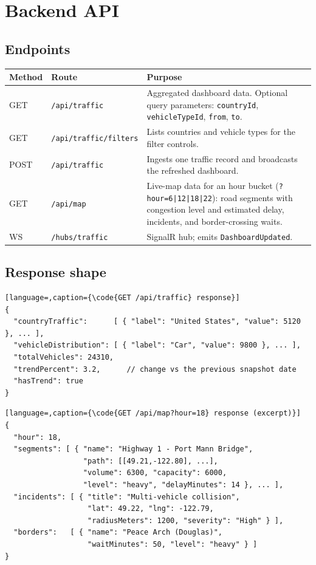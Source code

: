 \documentclass[11pt,a4paper]{article}
\newcommand{\code}[1]{\texttt{\small #1}}
\begin{document}
\section{Backend API}
\subsection{Endpoints}
\begin{longtable}{@{}llp{72mm}@{}}
\toprule
\textbf{Method} & \textbf{Route} & \textbf{Purpose} \\
\midrule
\endhead
GET  & \code{/api/traffic}         & Aggregated dashboard data. Optional query
       parameters: \code{countryId}, \code{vehicleTypeId}, \code{from},
       \code{to}. \\
GET  & \code{/api/traffic/filters} & Lists countries and vehicle types for the
       filter controls. \\
POST & \code{/api/traffic}         & Ingests one traffic record and broadcasts
       the refreshed dashboard. \\
GET  & \code{/api/map}             & Live-map data for an hour bucket
       (\code{?hour=6|12|18|22}): road segments with congestion level and
       estimated delay, incidents, and border-crossing waits. \\
WS   & \code{/hubs/traffic}        & SignalR hub; emits \code{DashboardUpdated}. \\
\bottomrule
\end{longtable}

\subsection{Response shape}
\begin{lstlisting}[language=,caption={\code{GET /api/traffic} response}]
{
  "countryTraffic":      [ { "label": "United States", "value": 5120 }, ... ],
  "vehicleDistribution": [ { "label": "Car", "value": 9800 }, ... ],
  "totalVehicles": 24310,
  "trendPercent": 3.2,      // change vs the previous snapshot date
  "hasTrend": true
}
\end{lstlisting}

\begin{lstlisting}[language=,caption={\code{GET /api/map?hour=18} response (excerpt)}]
{
  "hour": 18,
  "segments": [ { "name": "Highway 1 - Port Mann Bridge",
                  "path": [[49.21,-122.80], ...],
                  "volume": 6300, "capacity": 6000,
                  "level": "heavy", "delayMinutes": 14 }, ... ],
  "incidents": [ { "title": "Multi-vehicle collision",
                   "lat": 49.22, "lng": -122.79,
                   "radiusMeters": 1200, "severity": "High" } ],
  "borders":   [ { "name": "Peace Arch (Douglas)",
                   "waitMinutes": 50, "level": "heavy" } ]
}
\end{lstlisting}
\end{document}
